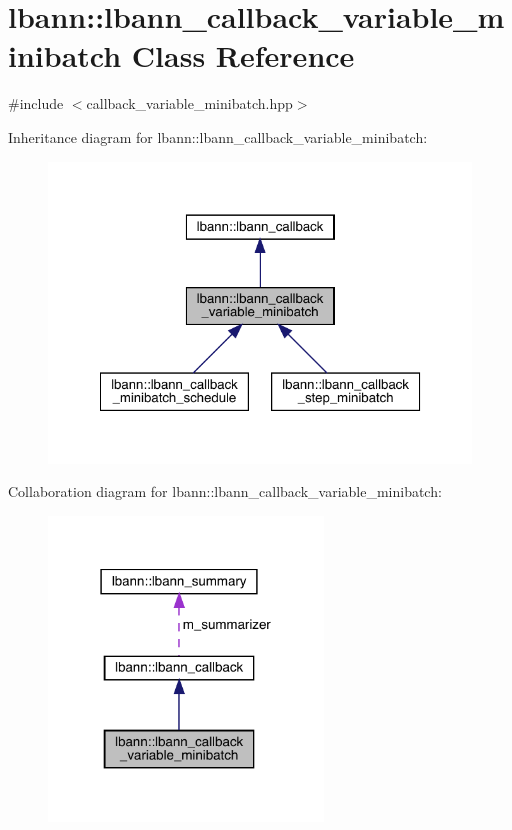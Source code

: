 \hypertarget{classlbann_1_1lbann__callback__variable__minibatch}{}\section{lbann\+:\+:lbann\+\_\+callback\+\_\+variable\+\_\+minibatch Class Reference}
\label{classlbann_1_1lbann__callback__variable__minibatch}


{\ttfamily \#include $<$callback\+\_\+variable\+\_\+minibatch.\+hpp$>$}



Inheritance diagram for lbann\+:\+:lbann\+\_\+callback\+\_\+variable\+\_\+minibatch\+:\nopagebreak
\begin{figure}[H]
\begin{center}
\leavevmode
\includegraphics[width=322pt]{classlbann_1_1lbann__callback__variable__minibatch__inherit__graph}
\end{center}
\end{figure}


Collaboration diagram for lbann\+:\+:lbann\+\_\+callback\+\_\+variable\+\_\+minibatch\+:\nopagebreak
\begin{figure}[H]
\begin{center}
\leavevmode
\includegraphics[width=207pt]{classlbann_1_1lbann__callback__variable__minibatch__coll__graph}
\end{center}
\end{figure}
